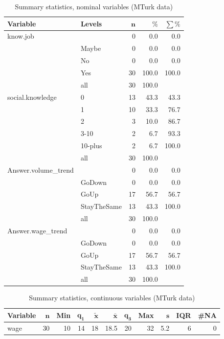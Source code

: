 \documentclass[a4paper,10pt]{article}\usepackage[]{graphicx}\usepackage[]{color}
\begin{document}
\begin{table}[ht]
\centering
{\footnotesize
\begin{tabular}{ll|rrr}
 \textbf{Variable} & \textbf{Levels} & $\mathbf{n}$ & $\mathbf{\%}$ & $\mathbf{\sum \%}$ \\ 
  \hline
know.job &  & 0 & 0.0 & 0.0 \\ 
   & Maybe & 0 & 0.0 & 0.0 \\ 
   & No & 0 & 0.0 & 0.0 \\ 
   & Yes & 30 & 100.0 & 100.0 \\ 
   \hline
 & all & 30 & 100.0 &  \\ 
   \hline
\hline
social.knowledge & 0 & 13 & 43.3 & 43.3 \\ 
   & 1 & 10 & 33.3 & 76.7 \\ 
   & 2 & 3 & 10.0 & 86.7 \\ 
   & 3-10 & 2 & 6.7 & 93.3 \\ 
   & 10-plus & 2 & 6.7 & 100.0 \\ 
   \hline
 & all & 30 & 100.0 &  \\ 
   \hline
\hline
Answer.volume\_trend &  & 0 & 0.0 & 0.0 \\ 
   & GoDown & 0 & 0.0 & 0.0 \\ 
   & GoUp & 17 & 56.7 & 56.7 \\ 
   & StayTheSame & 13 & 43.3 & 100.0 \\ 
   \hline
 & all & 30 & 100.0 &  \\ 
   \hline
\hline
Answer.wage\_trend &  & 0 & 0.0 & 0.0 \\ 
   & GoDown & 0 & 0.0 & 0.0 \\ 
   & GoUp & 17 & 56.7 & 56.7 \\ 
   & StayTheSame & 13 & 43.3 & 100.0 \\ 
   \hline
 & all & 30 & 100.0 &  \\ 
   \hline
\hline
\end{tabular}
}
\caption{Summary statistics, nominal variables (MTurk data)} 
\label{tab1:25-2050}
\end{table}
\begin{table}[ht]
\centering
{\footnotesize
\begin{tabular}{lrrrrrrrrrr}
 \textbf{Variable} & $\mathbf{n}$ & \textbf{Min} & $\mathbf{q_1}$ & $\mathbf{\widetilde{x}}$ & $\mathbf{\bar{x}}$ & $\mathbf{q_3}$ & \textbf{Max} & $\mathbf{s}$ & \textbf{IQR} & \textbf{\#NA} \\ 
  \hline
wage & 30 & 10 & 14 & 18 & 18.5 & 20 & 32 & 5.2 & 6 & 0 \\ 
  \end{tabular}
}
\caption{Summary statistics, continuous variables (MTurk data)} 
\label{tab2:25-2050}
\end{table}
\end{document}
